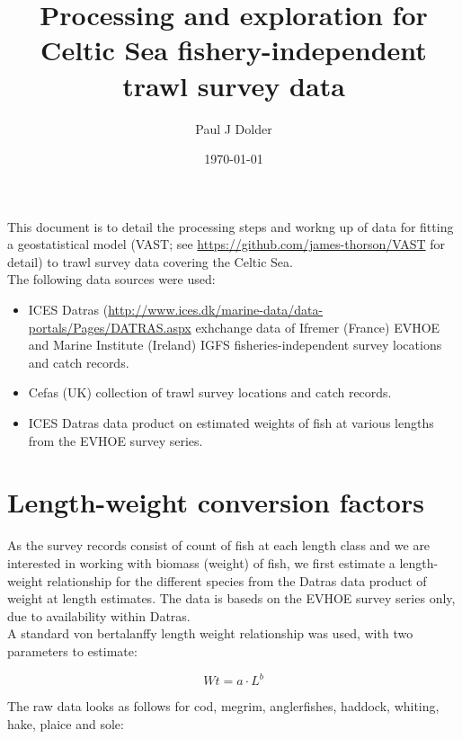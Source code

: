\documentclass[12pt]{article}\usepackage[]{graphicx}\usepackage[]{color}
\title{Processing and exploration for Celtic Sea fishery-independent trawl
	survey data}
\author{Paul J Dolder}
\date{\today}
\begin{document}
\maketitle

This document is to detail the processing steps and workng up of data for fitting
a geostatistical model (VAST; see \url{https://github.com/james-thorson/VAST}
for detail) to trawl survey data covering the Celtic Sea. \\

The following data sources were used:

\begin{itemize}
	\item ICES Datras
		(\url{http://www.ices.dk/marine-data/data-portals/Pages/DATRAS.aspx}
		exhchange data of Ifremer (France) EVHOE and Marine Institute
		(Ireland) IGFS fisheries-independent survey locations and catch
		records.
	\item Cefas (UK) collection of trawl survey locations and catch
		records.
	\item ICES Datras data product on estimated weights of fish at various
		lengths from the EVHOE survey series.
\end{itemize}

\section{Length-weight conversion factors}

As the survey records consist of count of fish at each length class and we are
interested in working with biomass (weight) of fish, we first estimate a
length-weight relationship for the different species from the Datras data
product of weight at length estimates. The data is baseds on the EVHOE survey
series only, due to availability within Datras. \\

A standard von bertalanffy length weight relationship was used, with two
parameters to estimate:

\begin{equation}\label{eq:1}
	Wt = a \cdot L^b
\end{equation}

The raw data looks as follows for cod, megrim, anglerfishes, haddock, whiting,
hake, plaice and sole:
\end{document}

